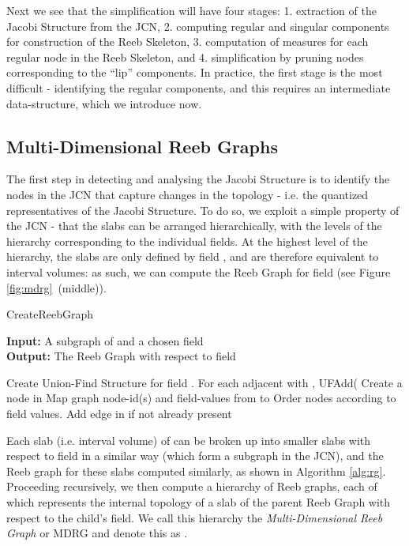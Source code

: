 \documentclass[twocolumn]{article}
\newcommand{\algoref}[1]{Algorithm \ref{alg:#1}}
\begin{document}
Next we see that the simplification will have four stages: 1. extraction of the 
Jacobi Structure from the JCN, 2. computing regular and singular
components for construction of the Reeb Skeleton,
3. computation of measures for each regular node in the Reeb Skeleton,
and 4. simplification by pruning nodes corresponding to the ``lip'' components.  In practice, the first stage is the most difficult - identifying the regular 
components, and this requires an intermediate data-structure, which we introduce now.

\subsection{Multi-Dimensional Reeb Graphs}
\label{sec:MDRG}
The first step in detecting and analysing the Jacobi Structure is to identify the
nodes in the JCN that capture changes in the topology - i.e. the quantized 
representatives of the Jacobi Structure.  To do so, we exploit a simple property
of the JCN - that the slabs can be arranged hierarchically, with the levels of the
hierarchy corresponding to the individual fields. At the highest level of the 
hierarchy, the slabs are only defined by field , and are therefore equivalent
to interval volumes: as such, we can compute the Reeb Graph for field
 (see Figure \ref{fig:mdrg}~(middle)). 

\begin{algorithm}
\caption{{\sc CreateReebGraph}}
\label{alg:rg}
{\bf Input:} A subgraph  of  and a chosen field \\
{\bf Output:} The Reeb Graph  with respect to field 
\begin{algorithmic}[1]
\State Create Union-Find Structure  for field .
\State For each adjacent  with , UFAdd(
\State Create a node  in 
\State Map graph node-id(s) and field-values from  to 
\EndFor
\State Order nodes  according to  field values.
\State Add edge  in  if not already present
\EndIf
\EndFor
\State \Return{}
\end{algorithmic}
\end{algorithm}

Each slab (i.e. interval volume) of  can be broken up into smaller slabs with respect to
field  in a similar way (which form a subgraph  in the JCN), and
the Reeb graph for these slabs computed similarly, as
shown in \algoref{rg}. Proceeding recursively, we then compute a hierarchy of Reeb graphs, 
each of which represents the internal topology of a slab of the parent Reeb Graph  
with respect to the child's field.  We call this hierarchy the \emph{Multi-Dimensional
Reeb Graph} or MDRG and denote this as .
\end{document}

